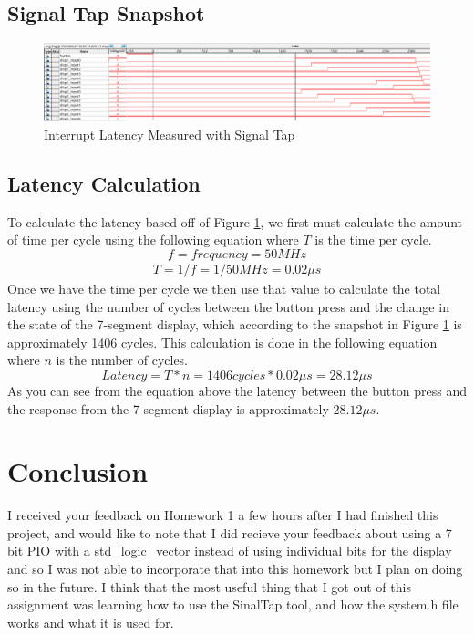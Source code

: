 \documentclass[10pt,a4paper]{article}
\begin{document}
		\subsection{Signal Tap Snapshot}
		\begin{figure}[H]
			\centering\includegraphics[width=15cm]{Interrupt_Latency.png}
			\caption{Interrupt Latency Measured with Signal Tap}
			\label{la10c}
		\end{figure}
		\subsection{Latency Calculation}
		To calculate the latency based off of Figure \ref{la10c}, we first must calculate the amount of time per cycle using the following equation where $T$ is the time per cycle.
		\begin{equation*}
		f = frequency = 50MHz 
		\end{equation*}
		\begin{align*}
		T = 1/f = 1/50MHz = 0.02\mu s
		\end{align*}
		Once we have the time per cycle we then use that value to calculate the total latency using the number of cycles between the button press and the change in the state of the 7-segment display, which according to the snapshot in Figure \ref{la10c} is approximately 1406 cycles. This calculation is done in the following equation where $n$ is the number of cycles.
		\begin{equation*}
		Latency = T*n = 1406 cycles * 0.02\mu s = 28.12\mu s
		\end{equation*}
		As you can see from the equation above the latency between the button press and the response from the 7-segment display is approximately $28.12\mu s$.
	\section{Conclusion}
	I received your feedback on Homework 1 a few hours after I had finished this project, and would like to note that I did recieve your feedback about using a 7 bit PIO with a std\_logic\_vector instead of using individual bits for the display and so I was not able to incorporate that into this homework but I plan on doing so in the future. I think that the most useful thing that I got out of this assignment was learning how to use the SinalTap tool, and how the system.h file works and what it is used for.
	\clearpage
	\appendix
\end{document}
